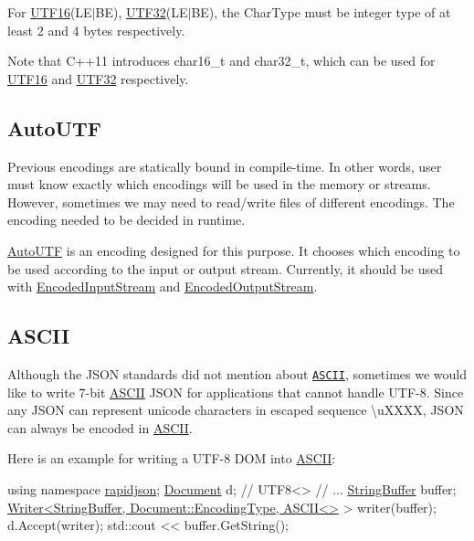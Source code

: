 For {\ttfamily \hyperlink{struct_u_t_f16}{U\+T\+F16}(L\+E$\vert$\+BE)}, {\ttfamily \hyperlink{struct_u_t_f32}{U\+T\+F32}(L\+E$\vert$\+BE)}, the {\ttfamily Char\+Type} must be integer type of at least 2 and 4 bytes respectively.

Note that C++11 introduces {\ttfamily char16\+\_\+t} and {\ttfamily char32\+\_\+t}, which can be used for {\ttfamily \hyperlink{struct_u_t_f16}{U\+T\+F16}} and {\ttfamily \hyperlink{struct_u_t_f32}{U\+T\+F32}} respectively.\hypertarget{md_Cadriciel_Commun_Externe_RapidJSON_doc_encoding.zh-cn_AutoUTF}{}\subsection{Auto\+U\+TF}\label{md_Cadriciel_Commun_Externe_RapidJSON_doc_encoding.zh-cn_AutoUTF}
Previous encodings are statically bound in compile-\/time. In other words, user must know exactly which encodings will be used in the memory or streams. However, sometimes we may need to read/write files of different encodings. The encoding needed to be decided in runtime.

{\ttfamily \hyperlink{struct_auto_u_t_f}{Auto\+U\+TF}} is an encoding designed for this purpose. It chooses which encoding to be used according to the input or output stream. Currently, it should be used with {\ttfamily \hyperlink{class_encoded_input_stream}{Encoded\+Input\+Stream}} and {\ttfamily \hyperlink{class_encoded_output_stream}{Encoded\+Output\+Stream}}.\hypertarget{md_Cadriciel_Commun_Externe_RapidJSON_doc_encoding.zh-cn_ASCII}{}\subsection{A\+S\+C\+II}\label{md_Cadriciel_Commun_Externe_RapidJSON_doc_encoding.zh-cn_ASCII}
Although the J\+S\+ON standards did not mention about \href{http://en.wikipedia.org/wiki/ASCII}{\tt A\+S\+C\+II}, sometimes we would like to write 7-\/bit \hyperlink{struct_a_s_c_i_i}{A\+S\+C\+II} J\+S\+ON for applications that cannot handle U\+T\+F-\/8. Since any J\+S\+ON can represent unicode characters in escaped sequence {\ttfamily \textbackslash{}u\+X\+X\+XX}, J\+S\+ON can always be encoded in \hyperlink{struct_a_s_c_i_i}{A\+S\+C\+II}.

Here is an example for writing a U\+T\+F-\/8 D\+OM into \hyperlink{struct_a_s_c_i_i}{A\+S\+C\+II}\+:


\begin{DoxyCode}
\textcolor{keyword}{using namespace }\hyperlink{namespacerapidjson}{rapidjson};
\hyperlink{class_generic_document}{Document} d; \textcolor{comment}{// UTF8<>}
\textcolor{comment}{// ...}
\hyperlink{class_generic_string_buffer}{StringBuffer} buffer;
\hyperlink{class_writer}{Writer<StringBuffer, Document::EncodingType, ASCII<>} > 
      writer(buffer);
d.Accept(writer);
std::cout << buffer.GetString();
\end{DoxyCode}



